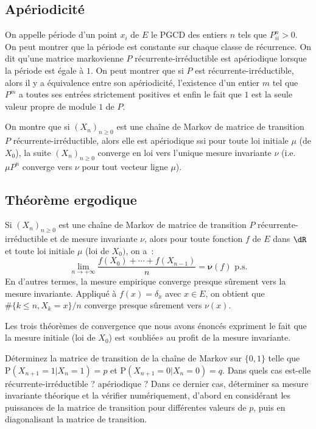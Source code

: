 %
\subsection{Apériodicité}
%

On appelle période d'un point $x_i$ de $E$ le PGCD des entiers $n$ tels que
$P^n_{ii}>0$. On peut montrer que la période est constante sur chaque classe
de récurrence. On dit qu'une matrice markovienne $P$ récurrente-irréductible
est apériodique lorsque la période est égale à $1$. On peut montrer que si $P$
est récurrente-irréductible, alors il y a équivalence entre son apériodicité,
l'existence d'un entier $m$ tel que $P^m$ a toutes ses entrées strictement
positives et enfin le fait que $1$ est la seule valeur propre de module $1$ de
$P$.

On montre que si $(X_n)_{n\geq 0}$ est une chaîne de Markov de matrice de
transition $P$ récurrente-irréductible, alors elle est apériodique ssi pour
toute loi initiale $\mu$ (de $X_0$), la suite $(X_n)_{n\geq 0}$ converge en
loi vers l'unique mesure invariante $\nu$ (i.e. $\mu P^n$ converge vers $\nu$
pour tout vecteur ligne $\mu$).


%
\subsection{Théorème ergodique}
%

Si $(X_n)_{n\geq 0}$ est une chaîne de Markov de matrice de transition $P$
récurrente-irréductible et de mesure invariante $\nu$, alors pour toute
fonction $f$ de $E$ dans $\dR$ et toute loi initiale $\mu$ (loi de $X_0)$, on
a~:
$$
\lim_{n\to+\infty} \frac{f(X_0) + \cdots + f(X_{n-1})}{n} =
\mathbf{\nu}(f) \text{ p.s.}
$$
En d'autres termes, la mesure empirique converge presque sûrement vers la
mesure invariante. Appliqué à $f(x)=\delta_{x}$ avec $x\in E$, on obtient que
$\#\{k\leq n, X_k = x\}/n$ converge presque sûrement vers $\nu(x)$.

Les trois théorèmes de convergence que nous avons énoncés expriment le fait
que la mesure initiale (loi de $X_0$) est «oubliée» au profit de la mesure
invariante.


\begin{exo}
  Déterminez la matrice de transition de la chaîne de Markov sur $\{0,1\}$ telle
  que $\mathrm{P}(X_{n+1}=1\vert X_n=1)=p$ et $\mathrm{P}(X_{n+1}=0\vert
  X_n=0)=q$. Dans quels cas est-elle récurrente-irréductible ? apériodique ?
  Dans ce dernier cas, déterminer sa mesure invariante théorique et la
  vérifier numériquement, d'abord en considérant les puissances de la matrice
  de transition pour différentes valeurs de $p$, puis en diagonalisant la
  matrice de transition.
\end{exo}

